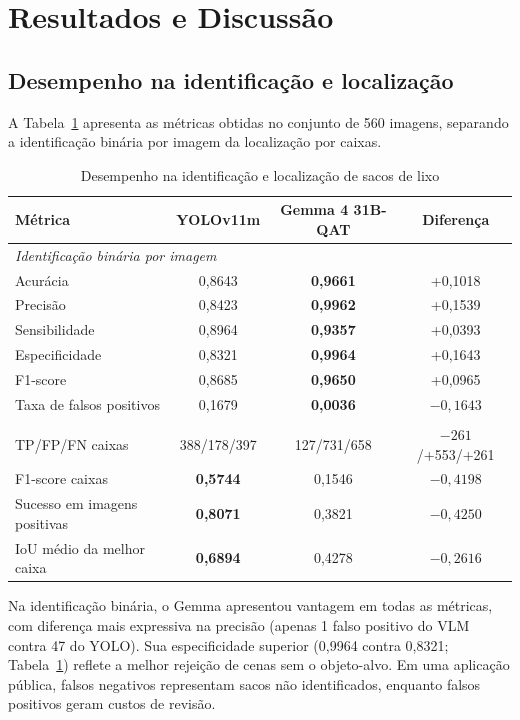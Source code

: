 \documentclass[kdmile,a4paper]{kdmile}
\begin{document}
\section{Resultados e Discussão}
\label{sec:resultados}

\subsection{Desempenho na identificação e localização}
\label{sec:desempenho-preditivo}

A Tabela~\ref{tab:desempenho} apresenta as métricas obtidas no conjunto de 560 imagens, separando a identificação binária por imagem da localização por caixas.

\begin{table}[htbp]
\centering
\scriptsize
\setlength{\tabcolsep}{4pt}
\renewcommand{\arraystretch}{0.95}
\caption{Desempenho na identificação e localização de sacos de lixo}
\label{tab:desempenho}
\begin{tabular}{lccc}
\toprule
\textbf{Métrica} & \textbf{YOLOv11m} & \textbf{Gemma 4 31B-QAT} & \textbf{Diferença} \\
\midrule
\multicolumn{4}{l}{\textit{Identificação binária por imagem}} \\
Acurácia & 0,8643 & \textbf{0,9661} & +0,1018 \\
Precisão & 0,8423 & \textbf{0,9962} & +0,1539 \\
Sensibilidade & 0,8964 & \textbf{0,9357} & +0,0393 \\
Especificidade & 0,8321 & \textbf{0,9964} & +0,1643 \\
F1-score & 0,8685 & \textbf{0,9650} & +0,0965 \\
Taxa de falsos positivos & 0,1679 & \textbf{0,0036} & $-0,1643$ \\
\addlinespace[2pt]
\multicolumn{4}{l}{\textit{Localização por caixas (IoU $\ge 0,5$)}} \\
TP/FP/FN caixas & 388/178/397 & 127/731/658 & $-261$/+553/+261 \\
F1-score caixas & \textbf{0,5744} & 0,1546 & $-0,4198$ \\
Sucesso em imagens positivas & \textbf{0,8071} & 0,3821 & $-0,4250$ \\
IoU médio da melhor caixa & \textbf{0,6894} & 0,4278 & $-0,2616$ \\
\bottomrule
\end{tabular}
\end{table}

Na identificação binária, o Gemma apresentou vantagem em todas as métricas, com diferença mais expressiva na precisão (apenas 1 falso positivo do VLM contra 47 do YOLO). Sua especificidade superior (0,9964 contra 0,8321; Tabela~\ref{tab:desempenho}) reflete a melhor rejeição de cenas sem o objeto-alvo. Em uma aplicação pública, falsos negativos representam sacos não identificados, enquanto falsos positivos geram custos de revisão.
\end{document}
